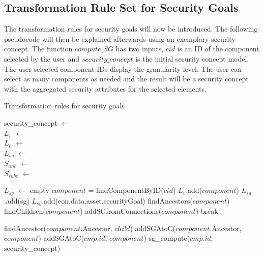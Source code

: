 \subsection{Transformation Rule Set for Security Goals}
\label{subsec:sec_goals_rules}

The transformation rules for security goals will now be introduced. The following pseudocode will then be explained afterwards using an exemplary security concept. The function  $compute\_SG$ has two inputs, $cid$ is  an ID of the component selected by the user and $security\_concept$ is the initial security concept model. The user-selected component IDs display the granularity level. The user can select as many components as needed and the result will be a security concept with the aggregated security attributes for the selected elements.

\begin{algorithm}[H]
\caption{Transformation rules for security goals}
security\_concept $\gets$  \\
$L_v$ $\gets$  \\
$L_c$ $\gets$  \\
$L_{sg}$ $\gets$  \\
$S_{anc}$ $\gets$  \\
$S_{subc}$ $\gets$  \\

\begin{algorithmic}[1]

\State $L_{sg}$ $\gets$ empty
\State $component$ = findComponentByID($cid$)
\State $L_v$.add($component$) \label{line:visited}
 \label{line:iterate_own_sg}
	\State $L_{sg}$.add(sg)	
\EndFor
{}
\State $L_{sg}$.add(con.data.asset.securityGoal)
\EndFor
\State findAncestors($component$) 
\State findChildren($component$) 
\State addSGfromConnections($component$)
\Else
\State break
\EndIf
\EndFunction

\EndIf
\State findAncestor($component$.Ancestor, $child$)
\State addSGAtoC($component$.Ancestor, $component$)
\Else
{}
\State addSGAtoC($cmp.id$, $component$)
\State sg\_compute($cmp.id$, security\_concept) \label{line:ancestor}
\EndFor
\EndIf

\EndFunction
{} 

\end{algorithmic}
\end{algorithm}

